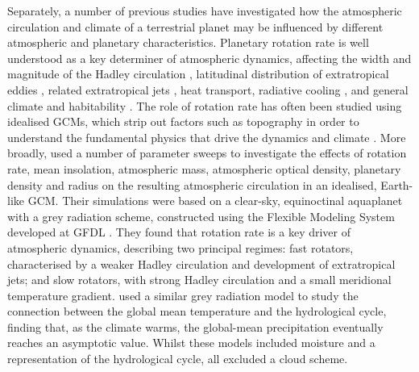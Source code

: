 Separately, a number of previous studies have investigated how the atmospheric circulation and climate of a terrestrial planet may be influenced by different atmospheric and planetary characteristics. Planetary rotation rate is well understood as a key determiner of atmospheric dynamics, affecting the width and magnitude of the Hadley circulation \citep{kaspi2015-ATMOSPHERIC, guendelman2018-Axisymmetric, singh2019-Limits, hill2022-Theory}, latitudinal distribution of extratropical eddies \citep{eady1949-Long, taylor1980-Roles}, related extratropical jets \citep{williams1978-Planetary, cho1996-Emergence, chemke2015-Latitudinal}, heat transport\citep{liu2017-effect, cox2021_radiative}, radiative cooling \citep{zhang2023_inhomogeneity}, and general climate and habitability \citep{yang2014-STRONG, haqq-misra2018-Demarcating, komacek2019-Atmospheric, jansen2019-Climates, guzewich2020, cox2021_radiative, he2022-Climate}. The role of rotation rate has often been studied using idealised GCMs, which strip out factors such as topography in order to understand the fundamental physics that drive the dynamics and climate \citep{schneider2006-General, ogorman2008-Hydrological, thomson2019-Effects}. More broadly, \citet{kaspi2015-ATMOSPHERIC} used a number of parameter sweeps to investigate the effects of rotation rate, mean insolation, atmospheric mass, atmospheric optical density, planetary density and radius on the resulting atmospheric circulation in an idealised, Earth-like GCM. Their simulations were based on a clear-sky, equinoctinal aquaplanet with a grey radiation scheme, constructed using the Flexible Modeling System developed at GFDL \citep{held1994-Proposal, anderson2004-New, frierson2006-GrayRadiation}. They found that rotation rate is a key driver of atmospheric dynamics, describing two principal regimes: fast rotators, characterised by a weaker Hadley circulation and development of extratropical jets; and slow rotators, with strong Hadley circulation and a small meridional temperature gradient. \citet{ogorman2008-Hydrological} used a similar grey radiation model to study the connection between the global mean temperature and the hydrological cycle, finding that, as the climate warms, the global-mean precipitation eventually reaches an asymptotic value. Whilst these models included moisture and a representation of the hydrological cycle, all excluded a cloud scheme. 

